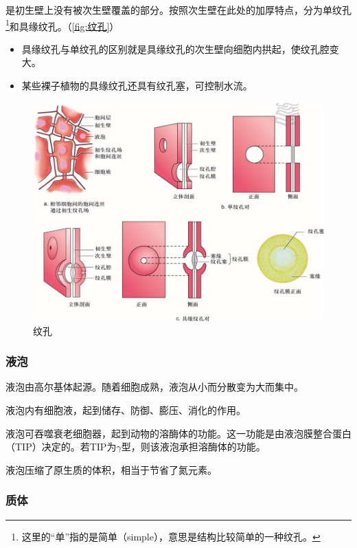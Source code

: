 	是初生壁上没有被次生壁覆盖的部分。按照次生壁在此处的加厚特点，分为单纹孔\footnote{这里的“单”指的是简单（simple），意思是结构比较简单的一种纹孔。}和具缘纹孔。（\autoref{fig:纹孔}）
	
	\begin{itemize}
		\item 具缘纹孔与单纹孔的区别就是具缘纹孔的次生壁向细胞内拱起，使纹孔腔变大。
		\item 某些裸子植物的具缘纹孔还具有纹孔塞，可控制水流。
	\end{itemize}
	
	\begin{figure}[htbp]
		\centering
		\includegraphics[width=\linewidth]{Pics/纹孔}
		\caption{纹孔}
		\label{fig:纹孔}
	\end{figure}
	
	\subsubsection{液泡}
	
	液泡由高尔基体起源。随着细胞成熟，液泡从小而分散变为大而集中。
	
	液泡内有细胞液，起到储存、防御、膨压、消化的作用。
	
	液泡可吞噬衰老细胞器，起到动物的溶酶体的功能。这一功能是由液泡膜整合蛋白（TIP）决定的。若TIP为$\gamma$型，则该液泡承担溶酶体的功能。
	
	液泡压缩了原生质的体积，相当于节省了氮元素。
	
	\subsubsection{质体}
	
